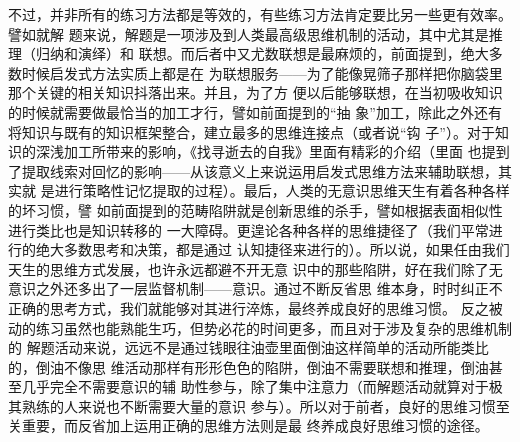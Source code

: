 \documentclass[11pt]{article}
\begin{document}
\begin{itemize}
不过，并非所有的练习方法都是等效的，有些练习方法肯定要比另一些更有效率。譬如就解
题来说，解题是一项涉及到人类最高级思维机制的活动，其中尤其是推理（归纳和演绎）和
联想。而后者中又尤数联想是最麻烦的，前面提到，绝大多数时候启发式方法实质上都是在
为联想服务——为了能像晃筛子那样把你脑袋里那个关键的相关知识抖落出来。并且，为了方
便以后能够联想，在当初吸收知识的时候就需要做最恰当的加工才行，譬如前面提到的“抽
象”加工，除此之外还有将知识与既有的知识框架整合，建立最多的思维连接点（或者说“钩
子”）。对于知识的深浅加工所带来的影响，《找寻逝去的自我》里面有精彩的介绍（里面
也提到了提取线索对回忆的影响——从该意义上来说运用启发式思维方法来辅助联想，其实就
是进行策略性记忆提取的过程）。最后，人类的无意识思维天生有着各种各样的坏习惯，譬
如前面提到的范畴陷阱就是创新思维的杀手，譬如根据表面相似性进行类比也是知识转移的
一大障碍。更遑论各种各样的思维捷径了（我们平常进行的绝大多数思考和决策，都是通过
认知捷径来进行的）。所以说，如果任由我们天生的思维方式发展，也许永远都避不开无意
识中的那些陷阱，好在我们除了无意识之外还多出了一层监督机制——意识。通过不断反省思
维本身，时时纠正不正确的思考方式，我们就能够对其进行淬炼，最终养成良好的思维习惯。
反之被动的练习虽然也能熟能生巧，但势必花的时间更多，而且对于涉及复杂的思维机制的
解题活动来说，远远不是通过钱眼往油壶里面倒油这样简单的活动所能类比的，倒油不像思
维活动那样有形形色色的陷阱，倒油不需要联想和推理，倒油甚至几乎完全不需要意识的辅
助性参与，除了集中注意力（而解题活动就算对于极其熟练的人来说也不断需要大量的意识
参与）。所以对于前者，良好的思维习惯至关重要，而反省加上运用正确的思维方法则是最
终养成良好思维习惯的途径。


\end{itemize}
\end{document}
